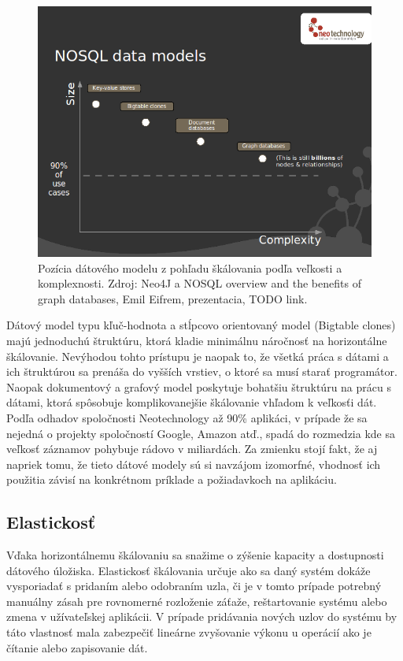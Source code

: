 \documentclass[11pt,twoside,a4paper]{book}
\begin{document}
\begin{figure}[h]
 \centering
 \includegraphics[width=13cm]{./figures/nosqldatamodels.png}
 \caption{Pozícia dátového modelu z pohľadu škálovania podľa veľkosti a komplexnosti. Zdroj: Neo4J a NOSQL overview and the benefits of graph databases, Emil Eifrem, prezentacia, TODO link.}
 \label{fig:scalling}
\end{figure}

Dátový model typu kľuč-hodnota a stĺpcovo orientovaný model (Bigtable clones) majú jednoduchú štruktúru, ktorá kladie minimálnu náročnosť na horizontálne škálovanie. Nevýhodou tohto prístupu je naopak to, že všetká práca s dátami a ich štruktúrou sa prenáša do vyšších vrstiev, o ktoré sa musí starať programátor. Naopak dokumentový a grafový model poskytuje bohatšiu štruktúru na prácu s dátami, ktorá spôsobuje komplikovanejšie škálovanie vhľadom k veľkosťi dát. Podľa odhadov spoločnosti Neotechnology až 90\% aplikáci, v prípade že sa nejedná o projekty spoločností Google, Amazon atď., spadá do rozmedzia kde sa veľkosť záznamov pohybuje rádovo v miliardách. Za zmienku stojí fakt, že aj napriek tomu, že tieto dátové modely sú si navzájom izomorfné, vhodnosť ich použitia závisí na konkrétnom príklade a požiadavkoch na aplikáciu. 

\subsection{Elastickosť}
Vďaka horizontálnemu škálovaniu sa snažime o zýšenie kapacity a dostupnosti dátového úložiska. Elastickosť škálovania určuje ako sa daný systém dokáže vysporiadať s pridaním alebo odobraním uzla, či je v tomto prípade potrebný manuálny zásah pre rovnomerné rozloženie záťaže, reštartovanie systému alebo zmena v užívateľskej aplikácii. V prípade pridávania nových uzlov do systému by táto vlastnosť mala zabezpečiť lineárne zvyšovanie výkonu u operácií ako je čítanie alebo zapisovanie dát.
\end{document}
